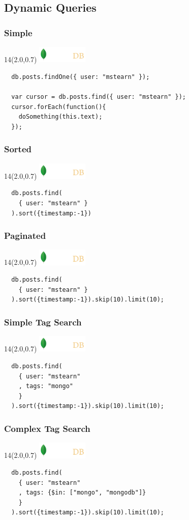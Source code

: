 \documentclass{beamer}
\newcommand{\MongoLogo}{
\begin{textblock}{14}(2.0,0.7)
  \includegraphics[height=0.8cm]{logo-mongodb-ondark.png}
\end{textblock}
}
\begin{document}
\subsection{Dynamic Queries}

\begin{frame}[fragile]
  \frametitle{Simple}
  \MongoLogo

  \begin{verbatim}
  db.posts.findOne({ user: "mstearn" });

  var cursor = db.posts.find({ user: "mstearn" });
  cursor.forEach(function(){
    doSomething(this.text);
  });
  \end{verbatim}
  
\end{frame}

\begin{frame}[fragile]
  \frametitle{Sorted}
  \MongoLogo

  \begin{verbatim}
  db.posts.find(
    { user: "mstearn" }
  ).sort({timestamp:-1})
  \end{verbatim}
  
\end{frame}
\begin{frame}[fragile]
  \frametitle{Paginated}
  \MongoLogo

  \begin{verbatim}
  db.posts.find(
    { user: "mstearn" }
  ).sort({timestamp:-1}).skip(10).limit(10);
  \end{verbatim}
  
\end{frame}
\begin{frame}[fragile]
  \frametitle{Simple Tag Search}
  \MongoLogo

  \begin{verbatim}
  db.posts.find(
    { user: "mstearn"
    , tags: "mongo"
    }
  ).sort({timestamp:-1}).skip(10).limit(10);
  \end{verbatim}
  
\end{frame}

\begin{frame}[fragile]
  \frametitle{Complex Tag Search}
  \MongoLogo

  \begin{verbatim}
  db.posts.find(
    { user: "mstearn"
    , tags: {$in: ["mongo", "mongodb"]}
    }
  ).sort({timestamp:-1}).skip(10).limit(10);
  \end{verbatim}
  
\end{frame}
\end{document}

